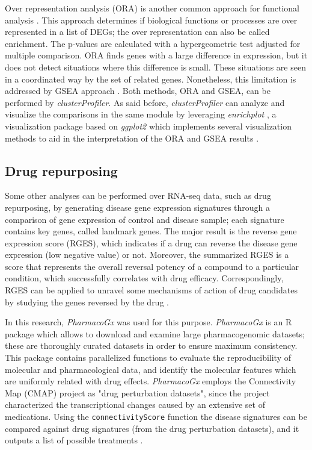 Over representation analysis (ORA) is another common approach for functional analysis \cite{ora}. This approach determines if biological functions or processes are over represented in a list of DEGs; the over representation can also be called enrichment. The p-values are calculated with a hypergeometric test adjusted for multiple comparison. ORA finds genes with a large difference in expression, but it does not detect situations where this difference is small. These situations are seen in a coordinated way by the set of related genes. Nonetheless, this limitation is addressed by GSEA approach \cite{clusterprofiler}. Both methods, ORA and GSEA, can be performed by \textit{clusterProfiler}. As said before, \textit{clusterProfiler} can analyze and visualize the comparisons in the same module by leveraging \textit{enrichplot} \cite{enrichplot}, a visualization package based on \textit{ggplot2} \cite{ggplot2} which implements several visualization methods to aid in the interpretation of the ORA and GSEA results \cite{clusterprofiler}.

\subsection{Drug repurposing}

Some other analyses can be performed over RNA-seq data, such as drug repurposing, by generating disease gene expression signatures through a comparison of gene expression of control and disease sample; each signature contains key genes, called landmark genes. The major result is the reverse gene expression score (RGES), which indicates if a drug can reverse the disease gene expression (low negative value) or not. Moreover, the summarized RGES is a score that represents the overall reversal potency of a compound to a particular condition, which successfully correlates with drug efficacy. Correspondingly, RGES can be applied to unravel some mechanisms of action of drug candidates by studying the genes reversed by the drug \cite{Chen}.

In this research, \textit{PharmacoGx} \cite{pharmacogx} was used for this purpose. \textit{PharmacoGx} is an R package which allows to download and examine large pharmacogenomic datasets; these are thoroughly curated datasets in order to ensure maximum consistency. This package contains parallelized functions to evaluate the reproducibility of molecular and pharmacological data, and identify the molecular features which are uniformly related with drug effects. \textit{PharmacoGx} employs the Connectivity Map (CMAP) project \cite{lamb} as "drug perturbation datasets", since the project characterized the transcriptional changes caused by an extensive set of medications. Using the \verb|connectivityScore| function the disease signatures can be compared against drug signatures (from the drug perturbation datasets), and it outputs a list of possible treatments \cite{pharmacogx}.

